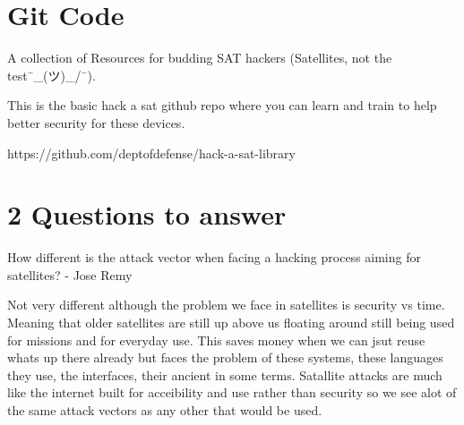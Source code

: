\section{Git Code}
A collection of Resources for budding SAT hackers (Satellites, not the test¯\_(ツ)_/¯).

This is the basic hack a sat github repo where you can learn and train to help better security for these devices.

https://github.com/deptofdefense/hack-a-sat-library

\section{2 Questions to answer}
How different is the attack vector when facing a hacking process aiming for satellites? - Jose Remy

Not very different although the problem we face in satellites is security vs time. Meaning that older satellites are still up above us floating around still being used for missions and for everyday use. This saves money when we can jsut reuse whats up there already but faces the problem of these systems, these languages they use, the interfaces, their ancient in some terms. Satallite attacks are much like the internet built for acceibility and use rather than security so we see alot of the same attack vectors as any other that would be used.






%
